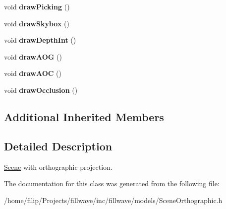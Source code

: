 \begin{DoxyCompactItemize}
\item 
\hypertarget{classfillwave_1_1models_1_1SceneOrthographic_ab68594f53862776907cc7010faa8964e}{}void {\bfseries draw\+Picking} ()\label{classfillwave_1_1models_1_1SceneOrthographic_ab68594f53862776907cc7010faa8964e}

\item 
\hypertarget{classfillwave_1_1models_1_1SceneOrthographic_a39b201a746b643acace89885b7adb113}{}void {\bfseries draw\+Skybox} ()\label{classfillwave_1_1models_1_1SceneOrthographic_a39b201a746b643acace89885b7adb113}

\item 
\hypertarget{classfillwave_1_1models_1_1SceneOrthographic_a6f63c0838958474c80259159be77dde0}{}void {\bfseries draw\+Depth\+Int} ()\label{classfillwave_1_1models_1_1SceneOrthographic_a6f63c0838958474c80259159be77dde0}

\item 
\hypertarget{classfillwave_1_1models_1_1SceneOrthographic_ae7d4b618094bc3fc064506ed685bb8a2}{}void {\bfseries draw\+A\+O\+G} ()\label{classfillwave_1_1models_1_1SceneOrthographic_ae7d4b618094bc3fc064506ed685bb8a2}

\item 
\hypertarget{classfillwave_1_1models_1_1SceneOrthographic_a999693a647e34fa8fb7f0410467db590}{}void {\bfseries draw\+A\+O\+C} ()\label{classfillwave_1_1models_1_1SceneOrthographic_a999693a647e34fa8fb7f0410467db590}

\item 
\hypertarget{classfillwave_1_1models_1_1SceneOrthographic_a65c9c76b2e1c47ce6dee56d41797e516}{}void {\bfseries draw\+Occlusion} ()\label{classfillwave_1_1models_1_1SceneOrthographic_a65c9c76b2e1c47ce6dee56d41797e516}

\end{DoxyCompactItemize}
\subsection*{Additional Inherited Members}


\subsection{Detailed Description}
\hyperlink{classfillwave_1_1models_1_1Scene}{Scene} with orthographic projection. 

The documentation for this class was generated from the following file\+:\begin{DoxyCompactItemize}
\item 
/home/filip/\+Projects/fillwave/inc/fillwave/models/Scene\+Orthographic.\+h\end{DoxyCompactItemize}
